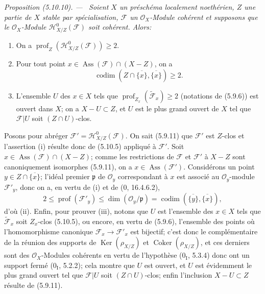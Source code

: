 \documentclass[10pt,oneside]{book}
\newcommand{\oldpage}[2][]{%
  \setcounter{footnote}{0}%
  \marginpar{\scriptsize\textbf{#1}~|~#2}\ignorespaces}
\newenvironment{proposition}[1][]{%
  \par\medskip\noindent\itshape Proposition (#1). ---\ }{\par}
\begin{document}
\begin{proposition}[5.10.10]
\label{IV.2.s5.10.10-fr}
Soient $X$ un préschéma localement noethérien, $Z$ une partie de $X$ stable
par spécialisation, $\mathcal F$ un $\mathcal O_X$-Module cohérent et supposons
que le $\mathcal O_X$-Module $\mathcal H^0_{X/Z}(\mathcal F)$ soit cohérent.
Alors:
\begin{enumerate}
\item[(i)] On a
$\operatorname{prof}_Z(\mathcal H^0_{X/Z}(\mathcal F))\geq2$.
\item[(ii)] Pour tout point
$x\in\operatorname{Ass}(\mathcal F)\cap(X-Z)$, on a
\[
\operatorname{codim}(Z\cap\overline{\{x\}},\overline{\{x\}})\geq2.
\]
\item[(iii)] L'ensemble $U$ des $x\in X$ tels que
$\operatorname{prof}_{Z_x}(\widetilde{\mathcal F}_x)\geq2$ (notations de
(5.9.6)) est ouvert dans $X$; on a $X-U\subset Z$, et $U$ est le plus grand
ouvert de $X$ tel que $\mathcal F|U$ soit $(Z\cap U)$-clos.
\end{enumerate}
\end{proposition}

\oldpage[IV-2]{118}

Posons pour abréger $\mathcal F'=\mathcal H^0_{X/Z}(\mathcal F)$. On sait
(5.9.11) que $\mathcal F'$ est $Z$-clos et l'assertion (i) résulte donc de
(5.10.5) appliqué à $\mathcal F'$. Soit
$x\in\operatorname{Ass}(\mathcal F)\cap(X-Z)$; comme les restrictions de
$\mathcal F$ et $\mathcal F'$ à $X-Z$ sont canoniquement isomorphes (5.9.11),
on a $x\in\operatorname{Ass}(\mathcal F')$. Considérons un point
$y\in Z\cap\overline{\{x\}}$; l'idéal premier $\mathfrak p$ de
$\mathcal O_y$ correspondant à $x$ est associé au $\mathcal O_y$-module
$\mathcal F'_y$, donc on a, en vertu de (i) et de (0, 16.4.6.2),
\[
2\leq\operatorname{prof}(\mathcal F'_y)
\leq\dim(\mathcal O_y/\mathfrak p)
=\operatorname{codim}(\overline{\{y\}},\overline{\{x\}}),
\]
d'où (ii). Enfin, pour prouver (iii), notons que $U$ est l'ensemble des
$x\in X$ tels que $\widetilde{\mathcal F}_x$ soit $Z_x$-clos (5.10.5), ou
encore, en vertu de (5.9.6), l'ensemble des points où l'homomorphisme
canonique $\mathcal F_x\to\mathcal F'_x$ est bijectif; c'est donc le
complémentaire de la réunion des supports de $\operatorname{Ker}(\rho_{X/Z})$
et $\operatorname{Coker}(\rho_{X/Z})$, et ces derniers sont des
$\mathcal O_X$-Modules cohérents en vertu de l'hypothèse (0$_\mathrm I$,
5.3.4) donc ont un support fermé (0$_\mathrm I$, 5.2.2); cela montre que $U$
est ouvert, et $U$ est évidemment le plus grand ouvert tel que $\mathcal F|U$
soit $(Z\cap U)$-clos; enfin l'inclusion $X-U\subset Z$ résulte de (5.9.11).
\end{document}
